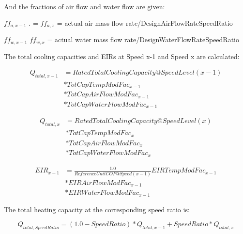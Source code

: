 And the fractions of air flow and water flow are given:

\(f{f_{a,x - 1}}\) . = \(f{f_{a,x}}\) = actual air mass flow rate/DesignAirFlowRateSpeedRatio

\(f{f_{w,x - 1}}\) \(f{f_{w,x}}\) = actual water mass flow rate/DesignWaterFlowRateSpeedRatio

The total cooling capacities and EIRs at Speed x-1 and Speed x are calculated:

\begin{equation}
  \begin{array}{rl}
    {Q_{total,x - 1}} &= RatedTotalCoolingCapacity@SpeedLevel\left( {x - 1} \right) \\
                      &* TotCapTempModFac_{x - 1} \\
                      &* TotCapAirFlowModFac_{x - 1} \\
                      &* TotCapWaterFlowModFac_{x - 1}
  \end{array}
\end{equation}

\begin{equation}
  \begin{array}{rl}
    {Q_{total,x}} &= RatedTotalCoolingCapacity@SpeedLevel\left( x \right) \\
                  &* TotCapTempModFac_x \\
                  &* TotCapAirFlowModFac_x \\
                  &* TotCapWaterFlowModFac_x
  \end{array}
\end{equation}

\begin{equation}
  \begin{array}{rl}
    EIR_{x - 1} &= \frac{{1.0}}{{ReferenceUnitCOP@Speed(x - 1)}}EIRTempModFac_{x - 1} \\
                &* EIRAirFlowModFac_{x - 1} \\
                &* EIRWaterFlowModFac_{x - 1}
  \end{array}
\end{equation}

The total heating capacity at the corresponding speed ratio is:

\begin{equation}
{Q_{total,SpeedRatio}} = \left( {1.0 - SpeedRatio} \right)*{Q_{total,x - 1}} + SpeedRatio*{Q_{total,x}}
\end{equation}


